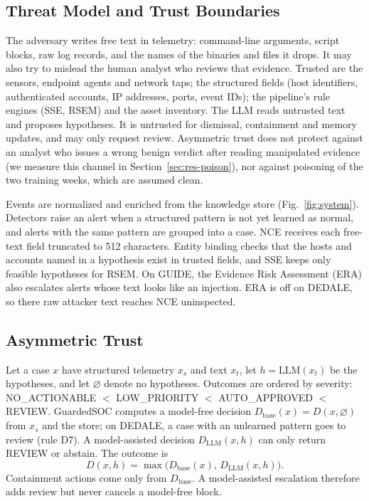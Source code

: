 \documentclass[conference]{IEEEtran}
\begin{document}
\subsection{Threat Model and Trust Boundaries}

The adversary writes free text in telemetry: command-line arguments, script blocks, raw log records, and the names
of the binaries and files it drops. It may also try to mislead the human analyst who reviews that evidence. Trusted
are the sensors, endpoint agents and network taps; the structured fields (host identifiers, authenticated
accounts, IP addresses, ports, event IDs); the pipeline's rule engines (SSE, RSEM) and the asset inventory. The LLM
reads untrusted text and proposes hypotheses. It is untrusted for dismissal, containment and memory updates, and may
only request review. Asymmetric trust does not protect against an analyst who issues a wrong benign verdict after
reading manipulated evidence (we measure this channel in Section~\ref{sec:res-poison}), nor against poisoning of the
two training weeks, which are assumed clean.

Events are normalized and enriched from the knowledge store (Fig.~\ref{fig:system}). Detectors raise an alert when
a structured pattern is not yet learned as normal, and alerts with the same pattern are grouped into a case. NCE
receives each free-text field truncated to 512 characters. Entity binding checks that the hosts and accounts named in a
hypothesis exist in trusted fields, and SSE keeps only feasible hypotheses for RSEM. On GUIDE, the Evidence Risk
Assessment (ERA) also escalates alerts whose text looks like an injection. ERA is off on DEDALE, so there raw
attacker text reaches NCE uninspected.

\subsection{Asymmetric Trust}

Let a case $x$ have structured telemetry $x_s$ and text $x_t$, let $h = \mathrm{LLM}(x_t)$ be the hypotheses, and
let $\varnothing$ denote no hypotheses. Outcomes are ordered by severity: NO\_ACTIONABLE $<$ LOW\_PRIORITY $<$
AUTO\_APPROVED $<$ REVIEW. GuardedSOC computes a model-free decision $D_{\mathrm{base}}(x) = D(x,\varnothing)$ from
$x_s$ and the store; on DEDALE, a case with an unlearned pattern goes to review (rule D7). A model-assisted decision
$D_{\mathrm{LLM}}(x,h)$ can only return REVIEW or abstain. The outcome is
\begin{equation}
D(x,h) = \max\bigl(D_{\mathrm{base}}(x),\, D_{\mathrm{LLM}}(x,h)\bigr).
\end{equation}
Containment actions come only from $D_{\mathrm{base}}$. A model-assisted escalation therefore adds review but never
cancels a model-free block.
\end{document}
